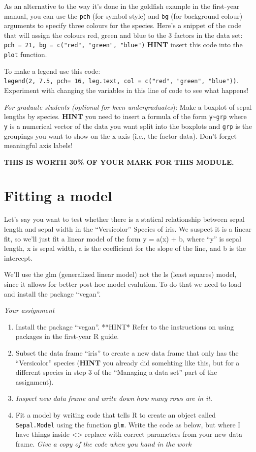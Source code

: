 \documentclass[]{book}
\begin{document}
As an alternative to the way it's done in the goldfish example in the
first-year manual, you can use the \texttt{pch} (for symbol style) and
\texttt{bg} (for background colour) arguments to specify three colours
for the species. Here's a snippet of the code that will assign the
colours red, green and blue to the 3 factors in the data set:
\texttt{pch\ =\ 21,\ bg\ =\ c("red",\ "green",\ "blue")} \textbf{HINT}
insert this code into the \texttt{plot} function.

To make a legend use this code:
\texttt{legend(2,\ 7.5,\ pch=\ 16,\ leg.text,\ col\ =\ c("red",\ "green",\ "blue"))}.
Experiment with changing the variables in this line of code to see what
happens!

\emph{For graduate students (optional for keen undergraduates}): Make a
boxplot of sepal lengths by species. \textbf{HINT} you need to insert a
formula of the form \texttt{y\textasciitilde{}grp} where \texttt{y} is a
numerical vector of the data you want split into the boxplots and
\texttt{grp} is the groupings you want to show on the x-axis (i.e., the
factor data). Don't forget meaningful axis labels!

\textbf{THIS IS WORTH 30\% OF YOUR MARK FOR THIS MODULE.}

\chapter{Fitting a model}\label{fitting-a-model}

Let's say you want to test whether there is a statical relationship
between sepal length and sepal width in the ``Versicolor'' Species of
iris. We suspect it is a linear fit, so we'll just fit a linear model of
the form y = a(x) + b, where ``y'' is sepal length, x is sepal width, a
is the coefficient for the slope of the line, and b is the intercept.

We'll use the glm (generalized linear model) not the ls (least squares)
model, since it allows for better post-hoc model evalution. To do that
we need to load and install the package ``vegan''.

\emph{Your assignment}

\begin{enumerate}
\def\labelenumi{\arabic{enumi}.}
\item
  Install the package ``vegan''. **HINT* Refer to the instructions on
  using packages in the first-year R guide.
\item
  Subset the data frame ``iris'' to create a new data frame that only
  has the ``Versicolor'' species (\textbf{HINT} you already did
  somehting like this, but for a different species in step 3 of the
  ``Managing a data set'' part of the assignment).
\item
  \emph{Inspect new data frame and write down how many rows are in it.}
\item
  Fit a model by writing code that tells R to create an object called
  \texttt{Sepal.Model} using the function \texttt{glm}. Write the code
  as below, but where I have things inside \textless{}\textgreater{}
  replace with correct parameters from your new data frame. \emph{Give a
  copy of the code when you hand in the work}
\end{enumerate}
\end{document}
